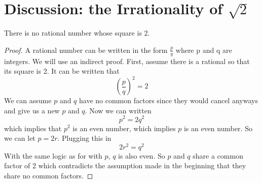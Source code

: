 \section{Discussion: the Irrationality of $\sqrt{2}$}
    \begin{theorem} 
        There is no rational number whose square is 2.
    \end{theorem}
    \begin{proof}
        A rational number can be written in the form $\frac{p}{q}$ where p and q are integers. We will use an indirect proof. First, assume there is a rational so that its square is 2. It can be written that
        \begin{equation*}
            (\frac{p}{q})^2 = 2
        \end{equation*}
        We can assume $p$ and $q$ have no common factors since they would cancel anyways and give us a new $p$ and $q$. Now we can written
        \begin{equation*}
            p ^ 2 = 2q^2
        \end{equation*}
        which implies that $p^2$ is an even number, which implies $p$ is an even number. So we can let $p = 2r$. Plugging this in
        \begin{equation*}
            2r^2 = q^2
        \end{equation*}
        With the same logic as for with $p$, $q$ is also even. So $p$ and $q$ share a common factor of 2 which contradicts the assumption made in the beginning that they share no common factors.
    \end{proof}
